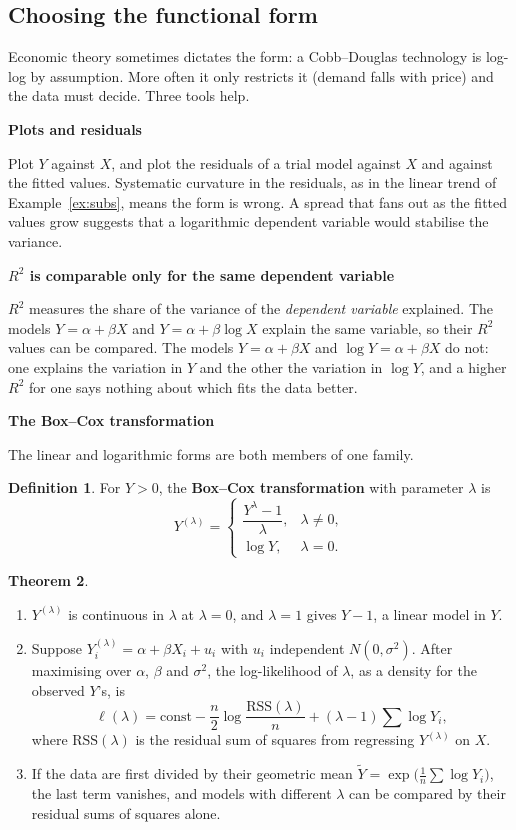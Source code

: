\documentclass[11pt,a4paper]{article}
\numberwithin{equation}{section}
\theoremstyle{definition}
\newtheorem{thm}{Theorem}[subsection]
\newtheorem{defn}[thm]{Definition}
\newcommand{\subhead}[1]{%
  \par\medskip\noindent\textbf{#1}\par\nobreak\smallskip}
\begin{document}
\subsection{Choosing the functional form}
\label{ssec:choose}

Economic theory sometimes dictates the form: a Cobb--Douglas technology is log-log by assumption. More often it only restricts it (demand falls
with price) and the data must decide. Three tools help.

\subhead{Plots and residuals}
Plot $Y$ against $X$, and plot the residuals of a trial model against $X$ and against the fitted values. Systematic curvature in the residuals,
as in the linear trend of Example~\ref{ex:subs}, means the form is wrong. A spread that fans out as the fitted values grow suggests that a
logarithmic dependent variable would stabilise the variance.

\subhead{$R^2$ is comparable only for the same dependent variable}
$R^2$ measures the share of the variance of the \emph{dependent variable} explained. The models $Y = \alpha + \beta X$ and $Y = \alpha + \beta\log X$
explain the same variable, so their $R^2$ values can be compared. The models $Y = \alpha + \beta X$ and $\log Y = \alpha + \beta X$ do not: one explains
the variation in $Y$ and the other the variation in $\log Y$, and a higher $R^2$ for one says nothing about which fits the data better.

\subhead{The Box--Cox transformation}
The linear and logarithmic forms are both members of one family.

\begin{defn}
For $Y > 0$, the \textbf{Box--Cox transformation} with parameter $\lambda$ is
\[
Y^{(\lambda)} = \begin{cases} \dfrac{Y^{\lambda} - 1}{\lambda}, & \lambda \neq 0,\\[6pt] \log Y, & \lambda = 0. \end{cases}
\]
\end{defn}

\begin{thm}
\label{thm:boxcox}
\begin{enumerate}[label=(\roman*)]
\item $Y^{(\lambda)}$ is continuous in $\lambda$ at $\lambda = 0$, and $\lambda = 1$ gives $Y - 1$, a linear model in $Y$.
\item Suppose $Y_i^{(\lambda)} = \alpha + \beta X_i + u_i$ with $u_i$ independent $N(0, \sigma^2)$. After maximising over $\alpha$, $\beta$ and $\sigma^2$, the
log-likelihood of $\lambda$, as a density for the observed $Y$'s, is
\[
\ell(\lambda) = \text{const} - \frac n2\log\frac{\text{RSS}(\lambda)}{n} + (\lambda - 1)\sum\log Y_i ,
\]
where $\text{RSS}(\lambda)$ is the residual sum of squares from regressing $Y^{(\lambda)}$ on $X$.
\item If the data are first divided by their geometric mean $\tilde Y = \exp\bigl(\frac1n\sum\log Y_i\bigr)$, the last term vanishes, and models with
different $\lambda$ can be compared by their residual sums of squares alone.
\end{enumerate}
\end{thm}
\end{document}
